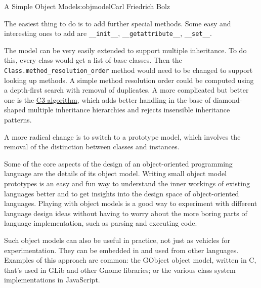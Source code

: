 \begin{aosachapter}{A Simple Object Model}{s:objmodel}{Carl Friedrich Bolz}
\begin{aosaitemize}
\item
  The easiest thing to do is to add further special methods. Some easy
  and interesting ones to add are \texttt{\_\_init\_\_},
  \texttt{\_\_getattribute\_\_}, \texttt{\_\_set\_\_}.
\item
  The model can be very easily extended to support multiple inheritance.
  To do this, every class would get a list of base classes. Then the
  \texttt{Class.method\_resolution\_order} method would need to be
  changed to support looking up methods. A simple method resolution
  order could be computed using a depth-first search with removal of
  duplicates. A more complicated but better one is the
  \href{https://www.python.org/download/releases/2.3/mro/}{C3
  algorithm}, which adds better handling in the base of diamond-shaped
  multiple inheritance hierarchies and rejects insensible inheritance
  patterns.
\item
  A more radical change is to switch to a prototype model, which
  involves the removal of the distinction between classes and instances.
\end{aosaitemize}

\label{conclusions}

Some of the core aspects of the design of an object-oriented programming
language are the details of its object model. Writing small object model
prototypes is an easy and fun way to understand the inner workings of
existing languages better and to get insights into the design space of
object-oriented languages. Playing with object models is a good way to
experiment with different language design ideas without having to worry
about the more boring parts of language implementation, such as parsing
and executing code.

Such object models can also be useful in practice, not just as vehicles
for experimentation. They can be embedded in and used from other
languages. Examples of this approach are common: the GObject object
model, written in C, that's used in GLib and other Gnome libraries; or
the various class system implementations in JavaScript.

\end{aosachapter}
